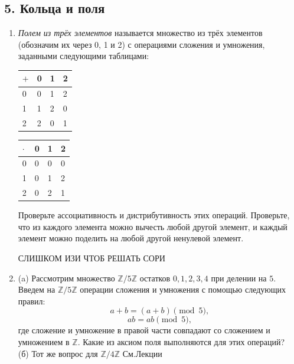 \documentclass[]{book}
\theoremstyle{definition}
\newcommand{\bb}[1]{\mathbb{#1}}
\begin{document}
\subsection*{5. Кольца и поля}

\begin{enumerate}[resume]


\item \textit{Полем из трёх элементов} называется множество из трёх элементов (обозначим их через 0, 1 и 2) с операциями сложения и умножения, заданными следующими таблицами:

\begin{minipage}{0.3\textwidth}

\begin{tabular}{ | l || l | l | l | }
\hline
$+$ & 0 & 1 & 2       \\ \hline \hline
0 & 0 & 1 & 2       \\ \hline
1 & 1 & 2 & 0    \\ \hline
2 & 2 & 0 & 1      \\
\hline
\end{tabular}
\end{minipage}
\begin{minipage}{0.3\textwidth}
\begin{tabular}{ | l || l | l | l | }
\hline
$\cdot$ & 0 & 1 & 2       \\ \hline \hline
0 & 0 & 0 & 0       \\ \hline
1 & 0 & 1 & 2    \\ \hline
2 & 0 & 2 & 1      \\
\hline
\end{tabular}
\end{minipage}

Проверьте ассоциативность и дистрибутивность этих операций. Проверьте, что из каждого элемента можно вычесть любой другой элемент, и каждый элемент можно поделить на любой другой ненулевой элемент.

СЛИШКОМ ИЗИ ЧТОБ РЕШАТЬ СОРИ

\item (a) Рассмотрим множество $\bb{Z}/ 5\bb{Z}$ остатков $0,1,2,3,4$ при делении на $5$. Введем на $\bb{Z}/ 5\bb{Z}$ операции сложения и умножения с помощью следующих правил:
$$a+b = (a+b)\pmod{5},$$
$$ab=ab\pmod{5},$$
где сложение и умножение в правой части совпадают со сложением и умножением в $\bb{Z}$. Какие из аксиом поля выполняются для этих операций?\\
(б) Тот же вопрос для  $\bb{Z}/ 4\bb{Z}$
См.Лекции




\end{enumerate}
\end{document}
